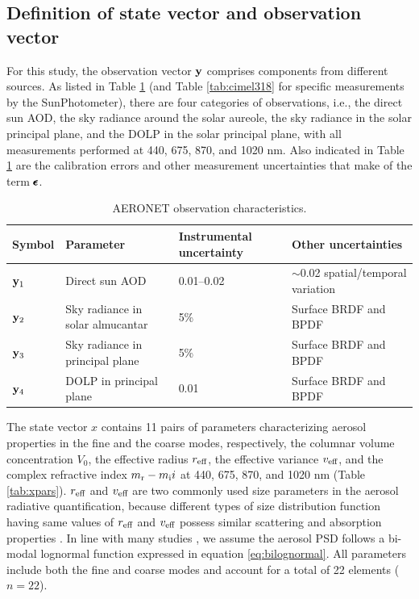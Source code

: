 \subsection{Definition of state vector and observation vector}
\label{subsec:xy}

For this study, the observation vector $\mathbf{y}$ comprises components from
different sources. As listed in Table \ref{tab:ypars} (and Table
\ref{tab:cimel318} for specific measurements by the SunPhotometer), there are 
four categories of observations, i.e., the direct sun AOD, the sky 
radiance around the solar aureole, the sky radiance in the solar 
principal plane, and the DOLP in the solar principal plane, with 
all measurements performed at 440, 675, 870, and 1020 nm. 
Also indicated in Table \ref{tab:ypars} are the calibration 
errors and other measurement uncertainties that make of the term $\pmb{\epsilon}$. 

\begin{table}[t]
  \centering
  \small
  \caption{AERONET observation characteristics.}
  \label{tab:ypars}
  \begin{tabular}{p{3em} p{13em} p{5em} p{13em} }
    \toprule
       Symbol & Parameter & Instrumental uncertainty & Other
uncertainties \\
    \midrule
       $\mathbf{y}_1$ & Direct sun AOD & 0.01--0.02 & $\sim$0.02
spatial/temporal variation \\ 
       $\mathbf{y}_2$ & Sky radiance in solar almucantar & 5\% & Surface BRDF
and BPDF \\
       $\mathbf{y}_3$ & Sky radiance in principal plane & 5\% & Surface BRDF
and BPDF \\
       $\mathbf{y}_4$ & DOLP in principal plane & 0.01 & Surface BRDF
and BPDF \\
    \bottomrule
  \end{tabular}
\end{table}

The state vector $x$ contains 11 pairs of parameters characterizing
aerosol properties in the fine and the coarse modes, respectively, the
columnar volume concentration $V_0$, the effective radius $r_\text{eff}$, the
effective variance $v_\text{eff}$, and the complex refractive index 
$m_\text{r}-m_\text{i} i$ at 440, 675, 870, and 1020 nm (Table \ref{tab:xpars}). $r_\text{eff}$ and 
$v_\text{eff}$ are two commonly used size parameters in the aerosol
radiative quantification, because different types of size distribution
function having same values of $r_\text{eff}$ and $v_\text{eff}$ possess similar
scattering and absorption properties \citep{Hansen74}. In line
with many studies \citep{Schuster06, Hasekamp05a, Hasekamp07,
Mishchenko07, Waquet09}, we assume the
aerosol PSD follows a bi-modal lognormal function expressed in equation
\eqref{eq:bilognormal}. All parameters include both the fine and coarse
modes and account for a total of 22 elements ($n=22$). 

